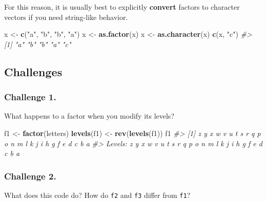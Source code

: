 \documentclass[
]{book}
\newenvironment{Shaded}{\begin{snugshade}}{\end{snugshade}}
\newcommand{\CommentTok}[1]{\textcolor[rgb]{0.56,0.35,0.01}{\textit{#1}}}
\newcommand{\KeywordTok}[1]{\textcolor[rgb]{0.13,0.29,0.53}{\textbf{#1}}}
\newcommand{\NormalTok}[1]{#1}
\newcommand{\StringTok}[1]{\textcolor[rgb]{0.31,0.60,0.02}{#1}}
\begin{document}
For this reason, it is usually best to explicitly \textbf{convert} factors to character vectors if you need string-like behavior.

\begin{Shaded}
\begin{Highlighting}[]
\NormalTok{x <-}\StringTok{ }\KeywordTok{c}\NormalTok{(}\StringTok{"a"}\NormalTok{, }\StringTok{"b"}\NormalTok{, }\StringTok{"b"}\NormalTok{, }\StringTok{"a"}\NormalTok{)}
\NormalTok{x <-}\StringTok{ }\KeywordTok{as.factor}\NormalTok{(x)}
\NormalTok{x <-}\StringTok{ }\KeywordTok{as.character}\NormalTok{(x)}
\KeywordTok{c}\NormalTok{(x, }\StringTok{"c"}\NormalTok{)}
\CommentTok{#> [1] "a" "b" "b" "a" "c"}
\end{Highlighting}
\end{Shaded}

\hypertarget{challenges-12}{%
\subsection{Challenges}\label{challenges-12}}

\hypertarget{challenge-1.-9}{%
\subsubsection*{Challenge 1.}\label{challenge-1.-9}}

What happens to a factor when you modify its levels?

\begin{Shaded}
\begin{Highlighting}[]
\NormalTok{f1 <-}\StringTok{ }\KeywordTok{factor}\NormalTok{(letters)}
\KeywordTok{levels}\NormalTok{(f1) <-}\StringTok{ }\KeywordTok{rev}\NormalTok{(}\KeywordTok{levels}\NormalTok{(f1))}
\NormalTok{f1}
\CommentTok{#>  [1] z y x w v u t s r q p o n m l k j i h g f e d c b a}
\CommentTok{#> Levels: z y x w v u t s r q p o n m l k j i h g f e d c b a}
\end{Highlighting}
\end{Shaded}

\hypertarget{challenge-2.-8}{%
\subsubsection*{Challenge 2.}\label{challenge-2.-8}}

What does this code do? How do \texttt{f2} and \texttt{f3} differ from \texttt{f1}?
\end{document}
